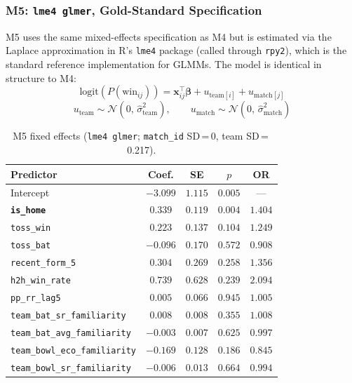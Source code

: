 \documentclass[12pt,a4paper]{article}
\begin{document}
\subsubsection{M5: \texttt{lme4 glmer}, Gold-Standard Specification}

M5 uses the same mixed-effects specification as M4 but is estimated via the Laplace
approximation in R's \texttt{lme4} package (called through \texttt{rpy2}), which is the
standard reference implementation for GLMMs. The model is identical in structure to M4:
\[
  \text{logit}\!\left(P(\text{win}_{ij})\right)
    = \mathbf{x}_{ij}^\top \boldsymbol{\beta}
    + u_{\text{team}[i]}
    + u_{\text{match}[j]}
\]
\[
  u_{\text{team}} \sim \mathcal{N}(0,\,\hat\sigma^2_{\text{team}}), \qquad
  u_{\text{match}} \sim \mathcal{N}(0,\,\hat\sigma^2_{\text{match}})
\]

\begin{table}[H]
\centering
\caption{M5 fixed effects (\texttt{lme4 glmer}; \texttt{match\_id} SD\,=\,0, team SD\,=\,0.217).}
\label{tab:m5}
\small
\begin{tabular}{lcccc}
\toprule
\textbf{Predictor} & \textbf{Coef.} & \textbf{SE} & \textbf{$p$} & \textbf{OR} \\
\midrule
Intercept                            & $-3.099$ & $1.115$ & $0.005$ & --- \\
\textbf{\texttt{is\_home}}           & $\mathbf{0.339}$ & $0.119$ & $\mathbf{0.004}$ & $\mathbf{1.404}$ \\
\texttt{toss\_win}                   & $0.223$  & $0.137$ & $0.104$ & $1.249$ \\
\texttt{toss\_bat}                   & $-0.096$ & $0.170$ & $0.572$ & $0.908$ \\
\texttt{recent\_form\_5}             & $0.304$  & $0.269$ & $0.258$ & $1.356$ \\
\texttt{h2h\_win\_rate}              & $0.739$  & $0.628$ & $0.239$ & $2.094$ \\
\texttt{pp\_rr\_lag5}                & $0.005$  & $0.066$ & $0.945$ & $1.005$ \\
\texttt{team\_bat\_sr\_familiarity}  & $0.008$  & $0.008$ & $0.355$ & $1.008$ \\
\texttt{team\_bat\_avg\_familiarity} & $-0.003$ & $0.007$ & $0.625$ & $0.997$ \\
\texttt{team\_bowl\_eco\_familiarity}& $-0.169$ & $0.128$ & $0.186$ & $0.845$ \\
\texttt{team\_bowl\_sr\_familiarity} & $-0.006$ & $0.013$ & $0.664$ & $0.994$ \\
\bottomrule
\end{tabular}
\end{table}
\end{document}
